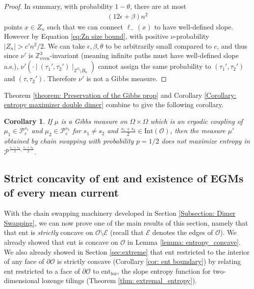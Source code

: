 \documentclass[11pt]{article}
\newtheorem{cor}[thm]{Corollary}
\theoremstyle{remark}
\theoremstyle{definition}
\newcommand{\Z}{\mathbb{Z}}
\newcommand{\ent}{\text{ent}}
\newcommand{\threeeven}{\Z^3_{\text{even}}}
\newcommand{\mc}[1]{\mathcal{#1}}
\newcommand{\m}[1]{\mathbb{#1}}
\begin{document}
\begin{proof}
    In summary, with probability $1-\theta$, there are at most 
    \begin{align*}
        (12 \epsilon + \beta)n^2
    \end{align*}
    points $x\in Z_n$ such that we can connect $\ell_-(x)$ to have well-defined slope. However by Equation \eqref{eq:Zn size bound}, with positive $\nu$-probability $|Z_n| > c'n^2/2$. We can take $\epsilon,\beta,\theta$ to be arbitrarily small compared to $c$, and thus since $\nu'$ is $\threeeven$-invariant (meaning infinite paths must have well-defined slope a.s.), $\nu'(\cdot~|~(\tau_1',\tau_2')\mid_{\m Z^3\setminus B_n})$ cannot assign the same probability to $(\tau_1',\tau_2')$ and $(\tau,\tau_2')$. Therefore $\nu'$ is not a Gibbs measure. 
\end{proof}

Theorem \ref{theorem: Preservation of the Gibbs prop} and Corollary \ref{Corollary: entropy maximizer double dimer} combine to give the following corollary. 
\begin{cor}
If $\mu$ is a Gibbs measure on $\Omega\times \Omega$ which is an ergodic coupling of $\mu_1 \in \mc P_e^{s_1}$ and $\mu_2\in \mc P_e^{s_2}$ for $s_1 \neq s_2$ and $\frac{s_1 + s_2}{2}\in \text{Int}(\mc O)$, then the measure $\mu'$ obtained by chain swapping with probability $p=1/2$ does not maximize entropy in $\mc P^{\frac{s_1+s_2}{2},\frac{s_1+s_2}{2}}$.
\end{cor}


\subsection{Strict concavity of ent and existence of EGMs of every mean current}\label{subsection: strict concavity}

With the chain swapping machinery developed in Section \ref{Subsection: Dimer Swapping}, we can now prove one of the main results of this section, namely that that $\ent$ is \textit{strictly} concave on $\mc O\setminus \mc E$ (recall that $\mc E$ denotes the edges of $\mc O$). We already showed that $\ent$ is concave on $\mc O$ in Lemma \ref{lemma: entropy_concave}. We also already showed in Section \ref{sec:extreme} that $\ent$ restricted to the interior of any face of $\partial \mc O$ is strictly concave (Corollary \ref{cor: ent boundary}) by relating $\ent$ restricted to a face of $\partial \mc O$ to $\ent_{\text{loz}}$, the slope entropy function for two-dimensional lozenge tilings (Theorem \ref{thm: extremal_entropy}). 
\end{document}
